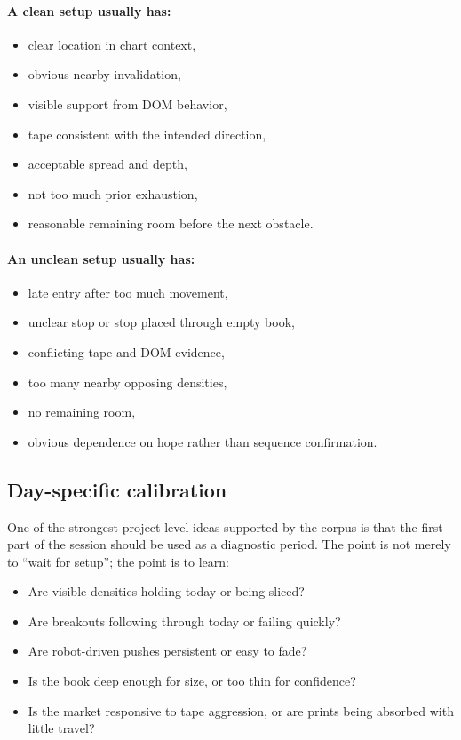 \paragraph{A clean setup usually has:}
\begin{itemize}
\item clear location in chart context,
\item obvious nearby invalidation,
\item visible support from DOM behavior,
\item tape consistent with the intended direction,
\item acceptable spread and depth,
\item not too much prior exhaustion,
\item reasonable remaining room before the next obstacle.
\end{itemize}

\paragraph{An unclean setup usually has:}
\begin{itemize}
\item late entry after too much movement,
\item unclear stop or stop placed through empty book,
\item conflicting tape and DOM evidence,
\item too many nearby opposing densities,
\item no remaining room,
\item obvious dependence on hope rather than sequence confirmation.
\end{itemize}

\subsection{Day-specific calibration}

One of the strongest project-level ideas supported by the corpus is that the first part of the session should be used as a diagnostic period. The point is not merely to ``wait for setup''; the point is to learn:

\begin{itemize}
\item Are visible densities holding today or being sliced?
\item Are breakouts following through today or failing quickly?
\item Are robot-driven pushes persistent or easy to fade?
\item Is the book deep enough for size, or too thin for confidence?
\item Is the market responsive to tape aggression, or are prints being absorbed with little travel?
\end{itemize}

